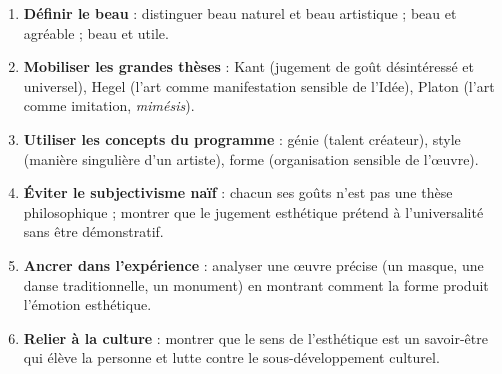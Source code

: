 \documentclass[11pt]{article}
\newcommand{\cle}[1]{{\popxbold\color{popdark}#1}}
\begin{document}
\begin{methode}
\begin{enumerate}
\item \textbf{Définir le beau} : distinguer beau naturel et beau artistique ; beau et agréable ; beau et utile.
\item \textbf{Mobiliser les grandes thèses} : Kant (jugement de goût désintéressé et universel), Hegel (l'art comme manifestation sensible de l'Idée), Platon (l'art comme imitation, \emph{mimésis}).
\item \textbf{Utiliser les concepts du programme} : \cle{génie} (talent créateur), \cle{style} (manière singulière d'un artiste), \cle{forme} (organisation sensible de l'œuvre).
\item \textbf{Éviter le subjectivisme naïf} : \guillemotleft chacun ses goûts \guillemotright n'est pas une thèse philosophique ; montrer que le jugement esthétique prétend à l'universalité sans être démonstratif.
\item \textbf{Ancrer dans l'expérience} : analyser une œuvre précise (un masque, une danse traditionnelle, un monument) en montrant comment la forme produit l'émotion esthétique.
\item \textbf{Relier à la culture} : montrer que le sens de l'esthétique est un savoir-être qui élève la personne et lutte contre le sous-développement culturel.
\end{enumerate}
\end{methode}
\end{document}
